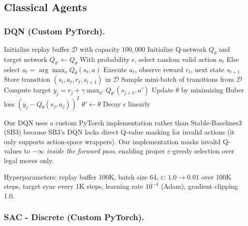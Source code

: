 \documentclass[letterpaper]{article}
\begin{document}
\subsection{Classical Agents}

\subsubsection{DQN (Custom PyTorch).}

\begin{algorithm}[htbp]
\caption{Deep Q-Network (DQN) for 2048}
\label{alg:dqn}
\begin{algorithmic}[1]
\State Initialize replay buffer $\mathcal{D}$ with capacity $100,000$
\State Initialize Q-network $Q_\theta$ and target network $Q_{\theta'} \leftarrow Q_\theta$
    \State With probability $\epsilon$, select random valid action $a_t$
    \State Else select $a_t = \arg\max_{a} Q_\theta(s_t, a)$
    \State Execute $a_t$, observe reward $r_t$, next state $s_{t+1}$
    \State Store transition $(s_t, a_t, r_t, s_{t+1})$ in $\mathcal{D}$
        \State Sample mini-batch of transitions from $\mathcal{D}$
        \State Compute target $y_j = r_j + \gamma \max_{a'} Q_{\theta'}(s_{j+1}, a')$
        \State Update $\theta$ by minimizing Huber loss $(y_j - Q_\theta(s_j, a_j))^2$
    \EndIf
        \State $\theta' \leftarrow \theta$
    \EndIf
    \State Decay $\epsilon$ linearly
\EndFor
\end{algorithmic}
\end{algorithm}

Our DQN uses a custom PyTorch implementation rather than Stable-Baselines3 (SB3) because SB3's DQN lacks direct Q-value masking for invalid actions (it only supports action-space wrappers). Our implementation masks invalid Q-values to $-\infty$ \emph{inside the forward pass}, enabling proper $\varepsilon$-greedy selection over legal moves only.

Hyperparameters: replay buffer 100K, batch size 64, $\varepsilon$: $1.0 \to 0.01$ over 100K steps, target sync every 1K steps, learning rate $10^{-4}$ (Adam), gradient clipping 1.0.

\subsubsection{SAC - Discrete (Custom PyTorch).}
\end{document}
